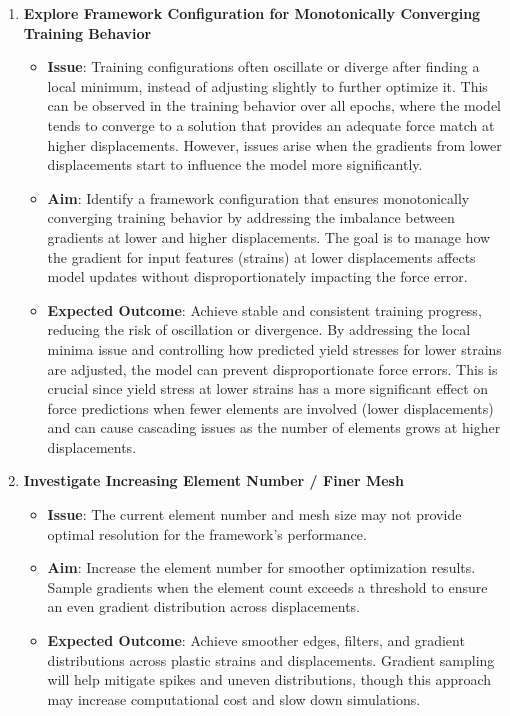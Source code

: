 \begin{enumerate}
    \item \textbf{Explore Framework Configuration for Monotonically Converging Training Behavior}
    \begin{itemize}
        \item \textbf{Issue}: Training configurations often oscillate or diverge after finding a local minimum, instead of adjusting slightly to further optimize it. This can be observed in the training behavior over all epochs, where the model tends to converge to a solution that provides an adequate force match at higher displacements. However, issues arise when the gradients from lower displacements start to influence the model more significantly.
        
        \item \textbf{Aim}: Identify a framework configuration that ensures monotonically converging training behavior by addressing the imbalance between gradients at lower and higher displacements. The goal is to manage how the gradient for input features (strains) at lower displacements affects model updates without disproportionately impacting the force error.
        
        \item \textbf{Expected Outcome}: Achieve stable and consistent training progress, reducing the risk of oscillation or divergence. By addressing the local minima issue and controlling how predicted yield stresses for lower strains are adjusted, the model can prevent disproportionate force errors. This is crucial since yield stress at lower strains has a more significant effect on force predictions when fewer elements are involved (lower displacements) and can cause cascading issues as the number of elements grows at higher displacements.
    \end{itemize}
    
\newpage
    \item \textbf{Investigate Increasing Element Number / Finer Mesh}
    \begin{itemize}
        \item \textbf{Issue}: The current element number and mesh size may not provide optimal resolution for the framework's performance.
        \item \textbf{Aim}: Increase the element number for smoother optimization results. Sample gradients when the element count exceeds a threshold to ensure an even gradient distribution across displacements.
        \item \textbf{Expected Outcome}: Achieve smoother edges, filters, and gradient distributions across plastic strains and displacements. Gradient sampling will help mitigate spikes and uneven distributions, though this approach may increase computational cost and slow down simulations.
    \end{itemize}


\end{enumerate}
